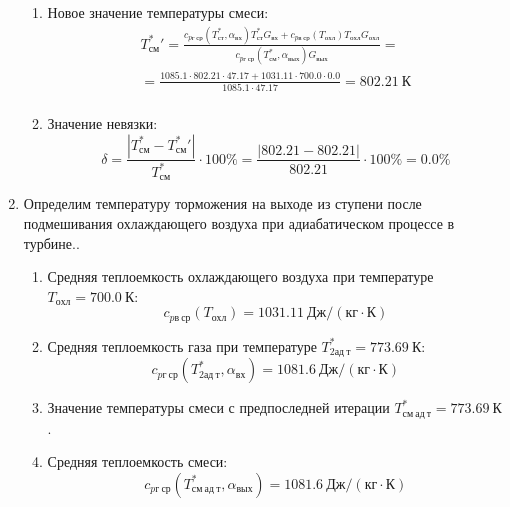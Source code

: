 \documentclass[a4paper,12pt]{article}
\begin{document}
\begin{enumerate}
\begin{enumerate}
            \item Новое значение температуры смеси:
            \begin{gather*}
                T_{см}^*\prime = \frac{
                        c_{pг\ ср} (T_{ст}^*, \alpha_{вх}) T_{ст}^* G_{вх} + c_{pв\ ср} (T_{охл}) T_{охл} G_{охл}
                    }{
                        c_{pг\ ср} (T_{см}^{*}, \alpha_{вых}) G_{вых}
                    } =\\
                = \frac{
                    1085.1
                    \cdot 802.21 \cdot 47.17 +
                    1031.11
                    \cdot 700.0 \cdot 0.0
                }{
                    1085.1
                    \cdot  47.17
                } =
                802.21\ К\\
            \end{gather*}

            \item Значение невязки:
            \[
                \delta = \frac{ \left| T_{см}^{*} - T_{см}^*\prime \right| }{T_{см}^{*}} \cdot 100 \% =
                    \frac{
                        \left| 802.21 - 802.21 \right|
                    }{
                        802.21
                    } \cdot 100 \% =
                0.0 \%
            \]
        \end{enumerate}


        \item Определим температуру торможения на выходе из ступени после подмешивания охлаждающего воздуха при адиабатическом процессе в турбине..
        \begin{enumerate}

            \item Средняя теплоемкость охлаждающего воздуха при температуре $T_{охл} = 700.0\ К $:
            \[
                c_{pв\ ср} (T_{охл}) = 1031.11\ Дж/ (кг \cdot К)
            \]

            \item Средняя теплоемкость газа при температуре $T_{2ад\ т}^* = 773.69 \ К $:
            \[
                c_{pг\ ср} (T_{2ад\ т}^*, \alpha_{вх}) =
                1081.6\ Дж/ (кг \cdot К)
            \]

            \item Значение температуры смеси с предпоследней итерации $T_{см\ ад\ т}^{*} = 773.69\ К$.

            \item Средняя теплоемкость смеси:
            \[
                c_{pг\ ср} (T_{см\ ад\ т}^{*}, \alpha_{вых}) =
                1081.6\ Дж/ (кг \cdot К)
            \]


\end{enumerate}
\end{enumerate}
\end{document}
